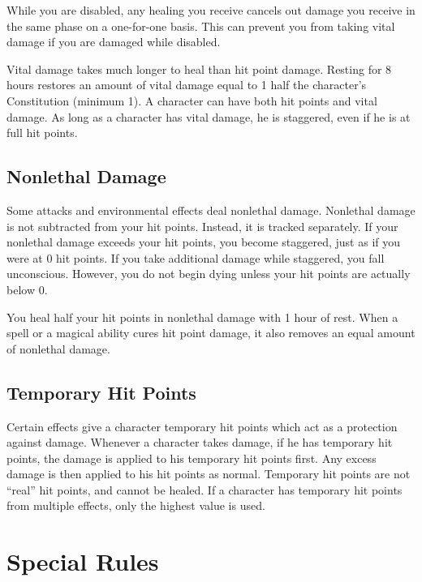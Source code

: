          While you are disabled, any healing you receive cancels out damage you receive in the same phase on a one-for-one basis.
        This can prevent you from taking vital damage if you are damaged while disabled.

         Vital damage takes much longer to heal than hit point damage.
        Resting for 8 hours restores an amount of vital damage equal to 1 \add half the character's Constitution (minimum 1).
        A character can have both hit points and vital damage.
        As long as a character has vital damage, he is staggered, even if he is at full hit points.

    \subsection{Nonlethal Damage}\label{Nonlethal Damage}
        Some attacks and environmental effects deal nonlethal damage.
        Nonlethal damage is not subtracted from your hit points.
        Instead, it is tracked separately.
        If your nonlethal damage exceeds your hit points, you become staggered, just as if you were at 0 hit points.
        If you take additional damage while staggered, you fall unconscious.
        However, you do not begin dying unless your hit points are actually below 0.

        You heal half your hit points in nonlethal damage with 1 hour of rest.
        When a spell or a magical ability cures hit point damage, it also removes an equal amount of nonlethal damage.

    \subsection{Temporary Hit Points}\label{Temporary Hit Points}
        Certain effects give a character temporary hit points which act as a protection against damage.
        Whenever a character takes damage, if he has temporary hit points, the damage is applied to his temporary hit points first.
        Any excess damage is then applied to his hit points as normal.
        Temporary hit points are not ``real'' hit points, and cannot be healed.
        If a character has temporary hit points from multiple effects, only the highest value is used.

\section{Special Rules}

